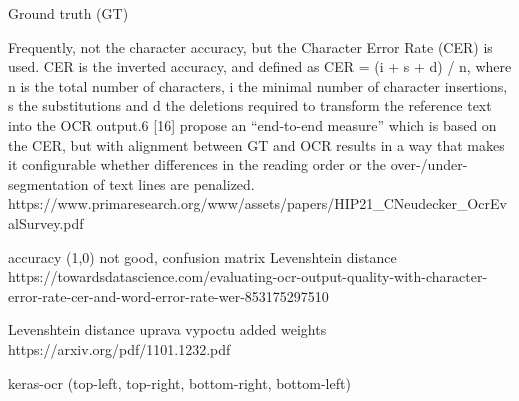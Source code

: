 Ground truth (GT)

Frequently, not the character accuracy, but the Character Error
Rate (CER) is used. CER is the inverted accuracy, and defined as
CER = (i + s + d) / n, where n is the total number of characters, i the
minimal number of character insertions, s the substitutions and d
the deletions required to transform the reference text into the OCR
output.6
[16] propose an “end-to-end measure” which is based on
the CER, but with alignment between GT and OCR results in a way
that makes it configurable whether differences in the reading order
or the over-/under-segmentation of text lines are penalized.
https://www.primaresearch.org/www/assets/papers/HIP21_CNeudecker_OcrEvalSurvey.pdf


accuracy (1,0) not good, confusion matrix
Levenshtein distance
https://towardsdatascience.com/evaluating-ocr-output-quality-with-character-error-rate-cer-and-word-error-rate-wer-853175297510

Levenshtein distance
uprava vypoctu added weights
https://arxiv.org/pdf/1101.1232.pdf

keras-ocr
(top-left, top-right, bottom-right, bottom-left) 